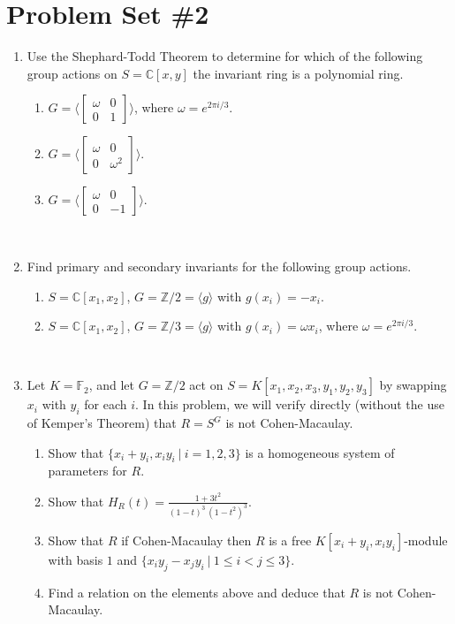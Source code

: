 \documentclass[12pt]{amsart}
\theoremstyle{definition}
\numberwithin{equation}{theorem}
\def\CC{\mathbb{C}}
\def\FF{\mathbb{F}}
\def\ZZ{\mathbb{Z}}
\begin{document}
\newpage

\section*{Problem Set \#2}




\begin{enumerate}

\item Use the Shephard-Todd Theorem to determine for which of the following group actions on $S=\CC[x,y]$ the invariant ring is a polynomial ring.
\begin{enumerate}
\item  $G=\langle \begin{bmatrix} \omega & 0 \\ 0 & 1 \end{bmatrix} \rangle$, where $\omega=e^{2\pi i / 3}$.
\item $G=\langle \begin{bmatrix} \omega & 0 \\ 0 & \omega^2 \end{bmatrix} \rangle$.
\item $G=\langle \begin{bmatrix} \omega & 0 \\ 0 & -1 \end{bmatrix} \rangle$.
\end{enumerate}

\

\item Find primary and secondary invariants for the following group actions.
\begin{enumerate}
\item $S=\CC[x_1,x_2]$, $G=\ZZ/2 = \langle g \rangle$ with $g(x_i) = -x_i$.
\item $S=\CC[x_1,x_2]$, $G=\ZZ/3 = \langle g \rangle$ with $g(x_i) = \omega x_i$, where $\omega=e^{2\pi i / 3}$.
\end{enumerate}

\



\item Let $K=\FF_2$, and let $G=\ZZ/2$ act on $S=K[x_1,x_2,x_3,y_1,y_2,y_3]$ by swapping $x_i$ with $y_i$ for each $i$. In this problem, we will verify directly (without the use of Kemper's Theorem) that $R=S^G$ is not Cohen-Macaulay.
\begin{enumerate}
\item Show that $\{ x_i + y_i, x_i y_i \ | \ i =1,2,3\}$ is a homogeneous system of parameters for $R$. 
\item Show that $H_R(t) = \frac{ 1 + 3t^2}{(1-t)^3 \, (1-t^2)^3}$.
\item Show that $R$ if Cohen-Macaulay then $R$ is a free $K[ x_i + y_i, x_i y_i]$-module with basis $1$ and $\{ x_i y_j - x_j y_i \ | \ 1\leq i < j \leq 3\}$.
\item Find a relation on the elements above and deduce that $R$ is not Cohen-Macaulay.
\end{enumerate}


\end{enumerate}
\end{document}
